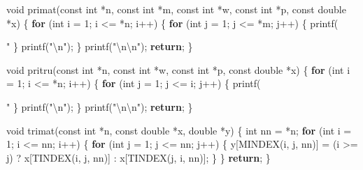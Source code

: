 \documentclass[12pt,]{article}
\newenvironment{Shaded}{\begin{snugshade}}{\end{snugshade}}
\newcommand{\DataTypeTok}[1]{\textcolor[rgb]{0.13,0.29,0.53}{#1}}
\newcommand{\DecValTok}[1]{\textcolor[rgb]{0.00,0.00,0.81}{#1}}
\newcommand{\SpecialCharTok}[1]{\textcolor[rgb]{0.00,0.00,0.00}{#1}}
\newcommand{\StringTok}[1]{\textcolor[rgb]{0.31,0.60,0.02}{#1}}
\newcommand{\ControlFlowTok}[1]{\textcolor[rgb]{0.13,0.29,0.53}{\textbf{#1}}}
\newcommand{\NormalTok}[1]{#1}
\begin{document}
\begin{Shaded}
\begin{Highlighting}[]
\DataTypeTok{void}\NormalTok{ primat(}\DataTypeTok{const} \DataTypeTok{int}\NormalTok{ *n, }\DataTypeTok{const} \DataTypeTok{int}\NormalTok{ *m, }\DataTypeTok{const} \DataTypeTok{int}\NormalTok{ *w, }\DataTypeTok{const} \DataTypeTok{int}\NormalTok{ *p,}
            \DataTypeTok{const} \DataTypeTok{double}\NormalTok{ *x) \{}
    \ControlFlowTok{for}\NormalTok{ (}\DataTypeTok{int}\NormalTok{ i = }\DecValTok{1}\NormalTok{; i <= *n; i++) \{}
        \ControlFlowTok{for}\NormalTok{ (}\DataTypeTok{int}\NormalTok{ j = }\DecValTok{1}\NormalTok{; j <= *m; j++) \{}
\NormalTok{            printf(}\StringTok{" %
\NormalTok{        \}}
\NormalTok{        printf(}\StringTok{"}\SpecialCharTok{\textbackslash{}n}\StringTok{"}\NormalTok{);}
\NormalTok{    \}}
\NormalTok{    printf(}\StringTok{"}\SpecialCharTok{\textbackslash{}n\textbackslash{}n}\StringTok{"}\NormalTok{);}
    \ControlFlowTok{return}\NormalTok{;}
\NormalTok{\}}

\DataTypeTok{void}\NormalTok{ pritru(}\DataTypeTok{const} \DataTypeTok{int}\NormalTok{ *n, }\DataTypeTok{const} \DataTypeTok{int}\NormalTok{ *w, }\DataTypeTok{const} \DataTypeTok{int}\NormalTok{ *p, }\DataTypeTok{const} \DataTypeTok{double}\NormalTok{ *x) \{}
    \ControlFlowTok{for}\NormalTok{ (}\DataTypeTok{int}\NormalTok{ i = }\DecValTok{1}\NormalTok{; i <= *n; i++) \{}
        \ControlFlowTok{for}\NormalTok{ (}\DataTypeTok{int}\NormalTok{ j = }\DecValTok{1}\NormalTok{; j <= i; j++) \{}
\NormalTok{            printf(}\StringTok{" %
\NormalTok{        \}}
\NormalTok{        printf(}\StringTok{"}\SpecialCharTok{\textbackslash{}n}\StringTok{"}\NormalTok{);}
\NormalTok{    \}}
\NormalTok{    printf(}\StringTok{"}\SpecialCharTok{\textbackslash{}n\textbackslash{}n}\StringTok{"}\NormalTok{);}
    \ControlFlowTok{return}\NormalTok{;}
\NormalTok{\}}

\DataTypeTok{void}\NormalTok{ trimat(}\DataTypeTok{const} \DataTypeTok{int}\NormalTok{ *n, }\DataTypeTok{const} \DataTypeTok{double}\NormalTok{ *x, }\DataTypeTok{double}\NormalTok{ *y) \{}
    \DataTypeTok{int}\NormalTok{ nn = *n;}
    \ControlFlowTok{for}\NormalTok{ (}\DataTypeTok{int}\NormalTok{ i = }\DecValTok{1}\NormalTok{; i <= nn; i++) \{}
        \ControlFlowTok{for}\NormalTok{ (}\DataTypeTok{int}\NormalTok{ j = }\DecValTok{1}\NormalTok{; j <= nn; j++) \{}
\NormalTok{            y[MINDEX(i, j, nn)] =}
\NormalTok{                (i >= j) ? x[TINDEX(i, j, nn)] : x[TINDEX(j, i, nn)];}
\NormalTok{        \}}
\NormalTok{    \}}
    \ControlFlowTok{return}\NormalTok{;}
\NormalTok{\}}

}}
\end{Highlighting}
\end{Shaded}
\end{document}
